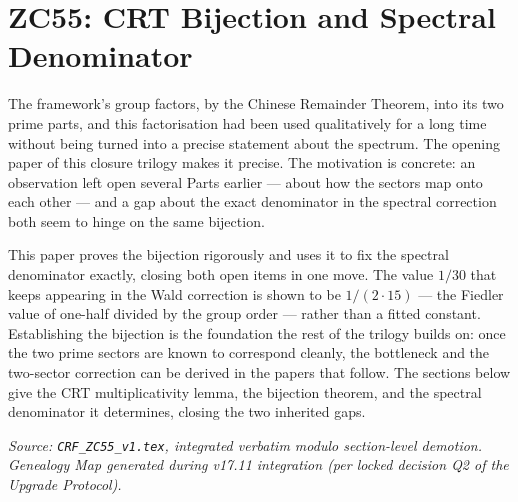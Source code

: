 \documentclass[12pt, a4paper]{article}
\begin{document}
\section{ZC55: CRT Bijection and Spectral Denominator}

The framework's group factors, by the Chinese Remainder Theorem, into its two
prime parts, and this factorisation had been used qualitatively for a long time
without being turned into a precise statement about the spectrum. The opening
paper of this closure trilogy makes it precise. The motivation is concrete: an
observation left open several Parts earlier --- about how the sectors map onto
each other --- and a gap about the exact denominator in the spectral correction
both seem to hinge on the same bijection.

This paper proves the bijection rigorously and uses it to fix the spectral
denominator exactly, closing both open items in one move. The value $1/30$ that
keeps appearing in the Wald correction is shown to be $1/(2\cdot 15)$ ---
the Fiedler value of one-half divided by the group order --- rather than a fitted
constant. Establishing the bijection is the foundation the rest of the trilogy
builds on: once the two prime sectors are known to correspond cleanly, the
bottleneck and the two-sector correction can be derived in the papers that
follow. The sections below give the CRT multiplicativity lemma, the bijection
theorem, and the spectral denominator it determines, closing the two inherited
gaps.
\label{sec:zc55}

\noindent
\textit{Source: \texttt{CRF\_ZC55\_v1.tex}, integrated verbatim
modulo section-level demotion. Genealogy Map generated during v17.11
integration (per locked decision Q2 of the Upgrade Protocol).}

\medskip
\end{document}
